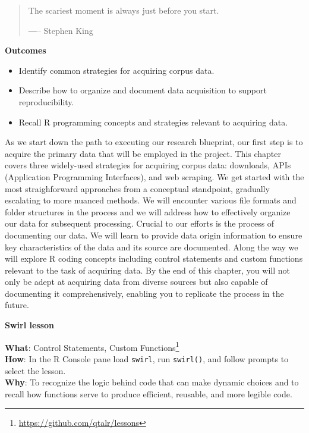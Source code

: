 \documentclass[
  letterpaper,
  DIV=11,
  numbers=noendperiod]{scrreport}
\providecommand{\tightlist}{%
  \setlength{\itemsep}{0pt}\setlength{\parskip}{0pt}}\usepackage{longtable,booktabs,array}
\theoremstyle{definition}
\theoremstyle{remark}
\DeclareRobustCommand{\href}[2]{#2\footnote{\url{#1}}}
\begin{document}
\begin{quote}
The scariest moment is always just before you start.

―-- Stephen King
\end{quote}

\begin{tcolorbox}[enhanced jigsaw, breakable, rightrule=.15mm, arc=.35mm, left=2mm, opacityback=0, leftrule=.75mm, toprule=.15mm, bottomrule=.15mm, colback=white]

\textbf{ Outcomes}

\begin{itemize}
\tightlist
\item
  Identify common strategies for acquiring corpus data.
\item
  Describe how to organize and document data acquisition to support
  reproducibility.
\item
  Recall R programming concepts and strategies relevant to acquiring
  data.
\end{itemize}

\end{tcolorbox}

As we start down the path to executing our research blueprint, our first
step is to acquire the primary data that will be employed in the
project. This chapter covers three widely-used strategies for acquiring
corpus data: downloads, APIs (Application Programming Interfaces), and
web scraping. We get started with the most straighforward approaches
from a conceptual standpoint, gradually escalating to more nuanced
methods. We will encounter various file formats and folder structures in
the process and we will address how to effectively organize our data for
subsequent processing. Crucial to our efforts is the process of
documenting our data. We will learn to provide data origin information
to ensure key characteristics of the data and its source are documented.
Along the way we will explore R coding concepts including control
statements and custom functions relevant to the task of acquiring data.
By the end of this chapter, you will not only be adept at acquiring data
from diverse sources but also capable of documenting it comprehensively,
enabling you to replicate the process in the future.

\begin{tcolorbox}[enhanced jigsaw, breakable, rightrule=.15mm, arc=.35mm, left=2mm, opacityback=0, leftrule=.75mm, toprule=.15mm, bottomrule=.15mm, colback=white]

\textbf{ Swirl lesson}

\textbf{What}: \href{https://github.com/qtalr/lessons}{Control
Statements, Custom Functions}\\
\textbf{How}: In the R Console pane load \texttt{swirl}, run
\texttt{swirl()}, and follow prompts to select the lesson.\\
\textbf{Why}: To recognize the logic behind code that can make dynamic
choices and to recall how functions serve to produce efficient,
reusable, and more legible code.

\end{tcolorbox}
\end{document}
